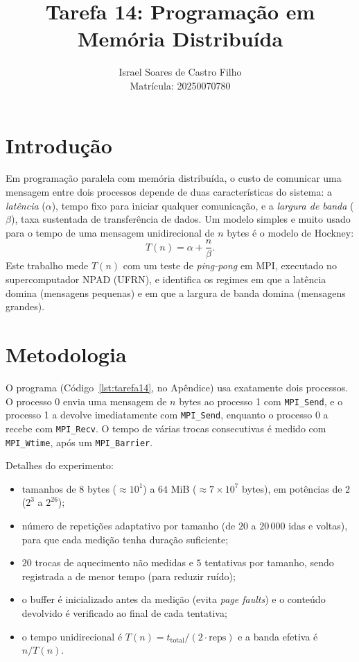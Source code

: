 \documentclass[a4paper,12pt]{article}
\title{Tarefa 14: Programação em Memória Distribuída}
\author{Israel Soares de Castro Filho \\ Matrícula: 20250070780}
\date{}
\begin{document}
\maketitle

\section{Introdução}

Em programação paralela com memória distribuída, o custo de comunicar uma mensagem
entre dois processos depende de duas características do sistema: a
\emph{latência} ($\alpha$), tempo fixo para iniciar qualquer comunicação, e a
\emph{largura de banda} ($\beta$), taxa sustentada de transferência de dados.
Um modelo simples e muito usado para o tempo de uma mensagem unidirecional de $n$
bytes é o modelo de Hockney:
\begin{equation}
    T(n) = \alpha + \frac{n}{\beta}.
\end{equation}
Este trabalho mede $T(n)$ com um teste de \emph{ping-pong} em MPI, executado no
supercomputador NPAD (UFRN), e identifica os regimes em que a latência domina
(mensagens pequenas) e em que a largura de banda domina (mensagens grandes).

\section{Metodologia}

O programa (Código~\ref{lst:tarefa14}, no Apêndice) usa exatamente dois processos.
O processo 0 envia uma mensagem de $n$ bytes ao processo 1 com \texttt{MPI\_Send}, e
o processo 1 a devolve imediatamente com \texttt{MPI\_Send}, enquanto o processo 0
a recebe com \texttt{MPI\_Recv}. O tempo de várias trocas consecutivas é medido com
\texttt{MPI\_Wtime}, após um \texttt{MPI\_Barrier}.

Detalhes do experimento:
\begin{itemize}
    \item tamanhos de $8$ bytes ($\approx 10^1$) a $64$ MiB ($\approx 7\times 10^7$ bytes), em potências de 2 ($2^3$ a $2^{26}$);
    \item número de repetições adaptativo por tamanho (de $20$ a $20\,000$ idas e
          voltas), para que cada medição tenha duração suficiente;
    \item $20$ trocas de aquecimento não medidas e $5$ tentativas por tamanho,
          sendo registrada a de menor tempo (para reduzir ruído);
    \item o buffer é inicializado antes da medição (evita \emph{page faults}) e o
          conteúdo devolvido é verificado ao final de cada tentativa;
    \item o tempo unidirecional é $T(n)=t_{\text{total}}/(2\cdot\text{reps})$ e a
          banda efetiva é $n/T(n)$.
\end{itemize}
\end{document}
